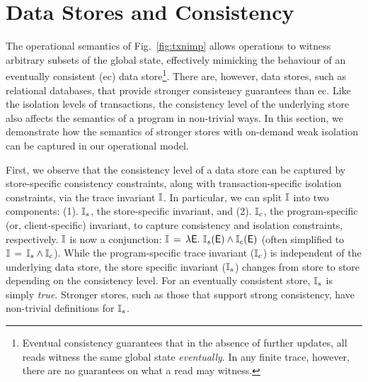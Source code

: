 \section{Data Stores and Consistency}
\label{sec:store-consistency}

The operational semantics of Fig.~\ref{fig:txnimp} allows operations
to witness arbitrary subsets of the global state, effectively mimicking the
behaviour of an eventually consistent ({\sc ec}) data
store\footnote{Eventual consistency guarantees that in the absence of further
  updates, all reads witness the same global state
  \emph{eventually}. In any finite trace, however, there are no
  guarantees on what a read may witness.}. There are, however, data stores,
such as relational databases, that provide stronger consistency
guarantees than {\sc ec}. Like the isolation levels of transactions,
the consistency level of the underlying store also affects the
semantics of a program in non-trivial ways. In this section, we
demonstrate how the semantics of stronger stores with on-demand weak
isolation can be captured in our operational model. 


First, we observe that the consistency level of a data store can be
captured by store-specific consistency constraints, along with
transaction-specific isolation constraints, via the trace invariant
$\mathbb{I}$. In particular, we can split $\mathbb{I}$ into two components: (1).
$\mathbb{I}_s$, the store-specific invariant, and (2). $\mathbb{I}_c$, the
program-specific (or, client-specific) invariant, to capture
consistency and isolation constraints, respectively.  $\mathbb{I}$ is now a
conjunction: $\mathbb{I} \,=\, \lambda\textsf{E}.~\mathbb{I}_s(\textsf{E}) \wedge \mathbb{I}_c(\textsf{E})$ (often
simplified to $\mathbb{I} \,=\, \mathbb{I}_s\wedge\mathbb{I}_c$).  While the program-specific
trace invariant ($\mathbb{I}_c$) is independent of the underlying data store,
the store specific invariant ($\mathbb{I}_s$) changes from store to store
depending on the consistency level.  For an eventually consistent
store, $\mathbb{I}_s$ is simply \emph{true}. Stronger stores, such as those
that support strong consistency, have non-trivial definitions for
$\mathbb{I}_s$.

